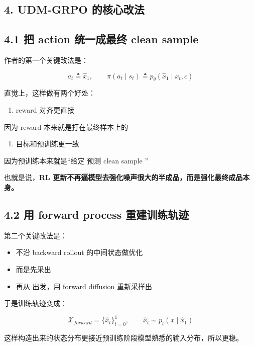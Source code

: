 \subsection{4. UDM-GRPO 的核心改法}

\subsection{4.1 把 action 统一成最终 clean sample}

作者的第一个关键改法是：

\[
a_t \triangleq \hat{x}_1,
\qquad
\pi(a_t \mid s_t)
\triangleq
p_\theta(\hat{x}_1 \mid x_t, c)
\]

直觉上，这样做有两个好处：

\begin{enumerate}[leftmargin=1.5em]
  \item reward 对齐更直接
\end{enumerate}

因为 reward 本来就是打在最终样本上的

\begin{enumerate}[leftmargin=1.5em]
  \item 目标和预训练更一致
\end{enumerate}

因为预训练本来就是“给定  预测 clean sample ”

也就是说，\textbf{RL 更新不再逼模型去强化噪声很大的半成品，而是强化最终成品本身。}

\subsection{4.2 用 forward process 重建训练轨迹}

第二个关键改法是：

\begin{itemize}[leftmargin=1.5em]
  \item 不沿 backward rollout 的中间状态做优化
  \item 而是先采出 
  \item 再从  出发，用 forward diffusion 重新采样出 
\end{itemize}

于是训练轨迹变成：

\[
\mathcal{X}_{forward} = \{\hat{x}_t\}_{t=0}^{1},
\qquad
\hat{x}_t \sim p_t(x \mid \hat{x}_1)
\]

这样构造出来的状态分布更接近预训练阶段模型熟悉的输入分布，所以更稳。

